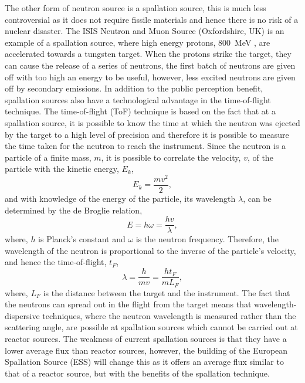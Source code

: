The other form of neutron source is a spallation source, this is much less controversial as it does not require fissile materials and hence there is no risk of a nuclear disaster.
The ISIS Neutron and Muon Source (Oxfordshire, UK) is an example of a spallation source, where high energy protons, \SI{800}{\mega\eV} \cite{noauthor_isis_nodate-1}, are accelerated towards a tungsten target.
When the protons strike the target, they can cause the release of a series of neutrons, the first batch of neutrons are given off with too high an energy to be useful, however, less excited neutrons are given off by secondary emissions.
In addition to the public perception benefit, spallation sources also have a technological advantage in the time-of-flight technique.
The time-of-flight (ToF) technique is based on the fact that at a spallation source, it is possible to know the time at which the neutron was ejected by the target to a high level of precision and therefore it is possible to measure the time taken for the neutron to reach the instrument.
Since the neutron is a particle of a finite mass, $m$, it is possible to correlate the velocity, $v$, of the particle with the kinetic energy, $E_k$,
%
\begin{equation}
    E_k = \frac{mv^2}{2},
\end{equation}
%
and with knowledge of the energy of the particle, its wavelength $\lambda$, can be determined by the de Broglie relation,
%
\begin{equation}
    E = h\omega = \frac{hv}{\lambda},
\end{equation}
%
where, $h$ is Planck's constant and $\omega$ is the neutron frequency.
Therefore, the wavelength of the neutron is proportional to the inverse of the particle's velocity, and hence the time-of-flight, $t_F$,
%
\begin{equation}
    \lambda = \frac{h}{mv} = \frac{ht_F}{mL_F},
\end{equation}
%
where, $L_F$ is the distance between the target and the instrument.
The fact that the neutrons can spread out in the flight from the target means that wavelength-dispersive techniques, where the neutron wavelength is measured rather than the scattering angle, are possible at spallation sources which cannot be carried out at reactor sources.
The weakness of current spallation sources is that they have a lower average flux than reactor sources, however, the building of the European Spallation Source (ESS) will change this as it offers an average flux similar to that of a reactor source, but with the benefits of the spallation technique.

